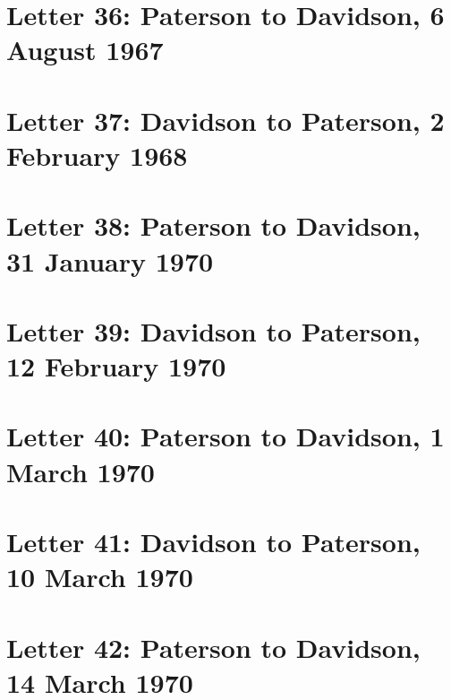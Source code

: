 \documentclass[a4paper,11pt,abstracton,hidelinks]{scrartcl}
\begin{document}
\section{Letter 36: Paterson to Davidson, 6 August 1967}


\section{Letter 37: Davidson to Paterson, 2 February 1968}


\section{Letter 38: Paterson to Davidson, 31 January 1970}


\section{Letter 39: Davidson to Paterson, 12 February 1970}


\section{Letter 40: Paterson to Davidson, 1 March 1970}


\section{Letter 41: Davidson to Paterson, 10 March 1970}


\section{Letter 42: Paterson to Davidson, 14 March 1970}

\end{document}
